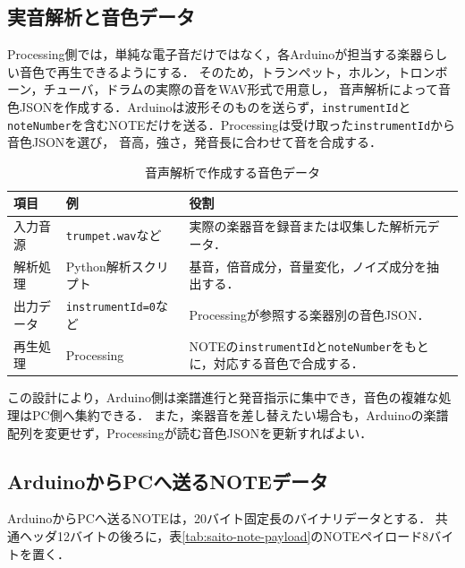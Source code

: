 \documentclass[uplatex,dvipdfmx]{jlreq}
\newcommand{\code}[1]{\texttt{#1}}
\begin{document}
\subsection{実音解析と音色データ}

Processing側では，単純な電子音だけではなく，各Arduinoが担当する楽器らしい音色で再生できるようにする．
そのため，トランペット，ホルン，トロンボーン，チューバ，ドラムの実際の音をWAV形式で用意し，
音声解析によって音色JSONを作成する．Arduinoは波形そのものを送らず，\code{instrumentId}と
\code{noteNumber}を含むNOTEだけを送る．Processingは受け取った\code{instrumentId}から音色JSONを選び，
音高，強さ，発音長に合わせて音を合成する．

\begin{table}[H]
\centering
\caption{音声解析で作成する音色データ}
\label{tab:saito-timbre-data}
\begin{tabular}{p{}p{}p{}}
\toprule
\textbf{項目} & \textbf{例} & \textbf{役割} \\
\midrule
入力音源 & \code{trumpet.wav}など & 実際の楽器音を録音または収集した解析元データ．\\
解析処理 & Python解析スクリプト & 基音，倍音成分，音量変化，ノイズ成分を抽出する．\\
出力データ & \code{instrumentId=0}など & Processingが参照する楽器別の音色JSON．\\
再生処理 & Processing & NOTEの\code{instrumentId}と\code{noteNumber}をもとに，対応する音色で合成する．\\
\bottomrule
\end{tabular}
\end{table}

この設計により，Arduino側は楽譜進行と発音指示に集中でき，音色の複雑な処理はPC側へ集約できる．
また，楽器音を差し替えたい場合も，Arduinoの楽譜配列を変更せず，Processingが読む音色JSONを更新すればよい．

\subsection{ArduinoからPCへ送るNOTEデータ}

ArduinoからPCへ送るNOTEは，20バイト固定長のバイナリデータとする．
共通ヘッダ12バイトの後ろに，表\ref{tab:saito-note-payload}のNOTEペイロード8バイトを置く．
\end{document}
